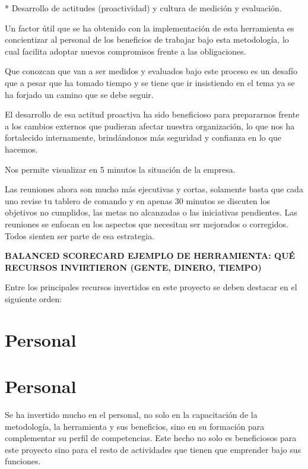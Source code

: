 {* Desarrollo de  actitudes (proactividad) y cultura de medición y evaluación.

Un factor útil que se ha obtenido con la implementación de esta herramienta es concientizar al personal de los beneficios de trabajar bajo esta metodología, lo cual facilita adoptar nuevos compromisos frente a las obligaciones.

Que conozcan que van a ser medidos y evaluados bajo este proceso es un desafío que a pesar que ha tomado tiempo y se tiene que ir insistiendo en el tema ya se ha forjado un camino que se debe seguir.

El desarrollo de esa actitud proactiva ha sido beneficioso para prepararnos frente a los cambios externos que pudieran afectar nuestra organización, lo que nos ha fortalecido internamente, brindándonos más seguridad y confianza en lo que hacemos.

Nos permite visualizar en 5 minutos la situación de la empresa.

Las reuniones ahora son mucho más ejecutivas y cortas, solamente basta que cada uno revise tu tablero de comando y en apenas 30 minutos se discuten los objetivos no cumplidos, las metas no alcanzadas o las iniciativas pendientes. Las reuniones se enfocan en los aspectos que necesitan ser mejorados o corregidos. Todos sienten ser parte de esa estrategia.
}


\begin{center}
\vspace*{0.1in}
\begin{Large}
\textbf{BALANCED SCORECARD EJEMPLO DE HERRAMIENTA: QUÉ RECURSOS INVIRTIERON (GENTE, DINERO, TIEMPO)} \\
\end{Large}
\end{center}

\item {Entre los principales recursos invertidos en este proyecto se deben destacar en el siguiente orden:}

\section{Personal}
\section{Personal}
\item {Se ha invertido mucho en el personal, no solo en la capacitación de la metodología, la herramienta y sus beneficios, sino en su formación para complementar su perfil de competencias. Este hecho no solo es beneficiosos para este proyecto sino para el resto de actividades que tienen que emprender bajo sus funciones.}

